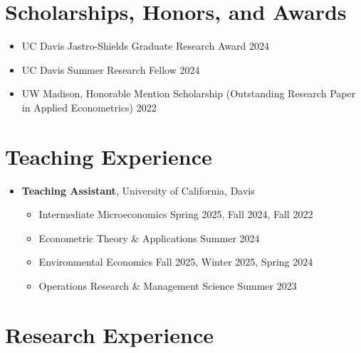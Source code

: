 \documentclass{article}[12]
\begin{document}
\section{Scholarships, Honors, and Awards}

\begin{itemize}   
    \item UC Davis Jastro-Shields Graduate Research Award \hfill 2024
    \item UC Davis Summer Research Fellow \hfill 2024
    \item UW Madison, Honorable Mention Scholarship (Outstanding Research Paper in Applied Econometrics) \hfill 2022   
\end{itemize}

\section{Teaching Experience}

\begin{itemize}[itemsep=0.5em]
    
    \item \textbf{Teaching Assistant}, University of California, Davis
    \begin{itemize}
        \item Intermediate Microeconomics \hfill Spring 2025, Fall 2024, Fall 2022
        \item Econometric Theory \& Applications \hfill Summer 2024 
        \item Environmental Economics \hfill Fall 2025, Winter 2025, Spring 2024
        \item Operations Research \& Management Science \hfill Summer 2023

    \end{itemize}
    
\end{itemize}

\section{Research Experience}
\end{document}
